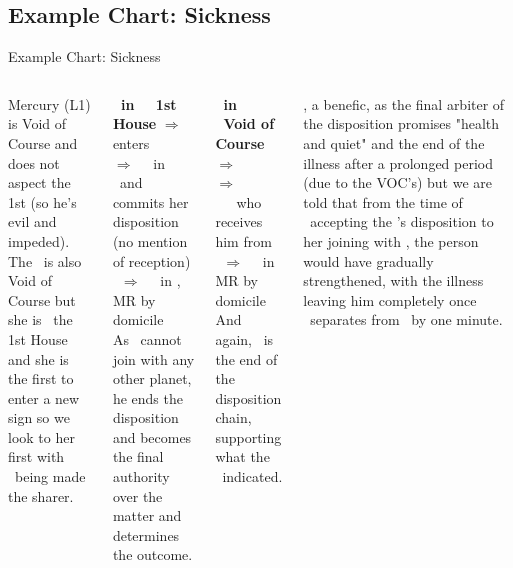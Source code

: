 \subsection{Example Chart: Sickness}
\begin{frame}[t]{Example Chart: Sickness }
\scriptsize
\begin{columns}[T, onlytextwidth]
Mercury (L1) is Void of Course and does not aspect the 1st (so he's evil and impeded). \\
\vspace{0.2cm}
The \Moon\ is also Void of Course but she is \Trine\ the 1st House and she is the first to enter a new sign so we look to her first with \Mercury\ being made the sharer. \\
\vspace{0.2cm}

\textbf{\Moon\ in \Taurus\ \Trine\ 1st House} $\Rightarrow$ enters \Gemini \\
$\Rightarrow$ \Square\ \Venus\ in \Pisces\ and commits her disposition (no mention of reception) \\
\Venus\ $\Rightarrow$ \Sextile\ \Jupiter\ in \Taurus, MR by domicile \\
As \Jupiter\ cannot join with any other planet, he ends the disposition and becomes the final authority over the matter and determines the outcome.
\vspace{0.2cm}

\textbf{\Mercury\ in \Aries\ Void of Course} $\Rightarrow$ \Taurus \\
$\Rightarrow$ \Sextile\ \Venus\ \Pisces\ who receives him from \Taurus \\
\Venus\ $\Rightarrow$ \Trine\ \Jupiter\ in \Taurus\, MR by domicile \\
And again, \Jupiter\ is the end of the disposition chain, supporting what the \Moon\ indicated.
\vspace{0.2cm}

\Jupiter, a benefic, as the final arbiter of the disposition promises "health and quiet" and the end of the illness after a prolonged period (due to the VOC's) but we are told that from the time of \Venus\ accepting the \Moon's disposition to her joining with \Jupiter, the person would have gradually strengthened, with the illness leaving him completely once \Venus\ separates from \Jupiter\ by one minute.



\end{columns}
\end{frame}

